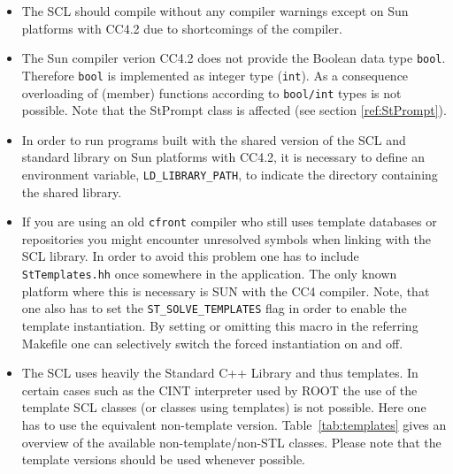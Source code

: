 \documentclass[twoside]{article}
\newcommand{\name}[1]{\textsf{#1}}%
\newcommand{\comp}[1]{\texttt{#1}}%
\begin{document}
\begin{itemize}
\item The SCL should compile without any compiler warnings except on
    \name{Sun}  platforms with CC4.2 due to shortcomings of
    the compiler.
\item The \name{Sun} compiler verion CC4.2 does not provide the
    Boolean data type \comp{bool}.  Therefore \comp{bool}
    is implemented as integer type (\comp{int}).  As a consequence
    overloading of (member) functions according to \comp{bool/int}
    types is not possible. Note that the StPrompt 
    class is affected (see section \ref{ref:StPrompt}).
\item In order to run programs built with the shared version of the
    SCL and standard library on Sun platforms with CC4.2, it is
    necessary to define an environment variable,
    \comp{LD\_LIBRARY\_PATH}, to indicate the
    directory containing the shared library.
\item If you are using an old \texttt{cfront} compiler  who still uses template databases or repositories
    you might encounter unresolved symbols when linking with the SCL
    library.  In order to avoid this problem one has to include
    \comp{StTemplates.hh} once somewhere in the
    application. The only known platform where this is necessary is
    SUN with the CC4 compiler. Note, that one also has to set the
    \comp{ST\_SOLVE\_TEMPLATES} flag in order to enable the template
    instantiation.  By setting or omitting this macro in the referring
    Makefile one can selectively switch the forced instantiation on
    and off.
\item The SCL uses heavily the Standard C++ Library and thus
    templates. In certain cases such as the CINT 
    interpreter used by ROOT  the use of the template SCL
    classes (or classes using templates) is not possible.  Here one
    has to use the equivalent non-template version.
    Table~\ref{tab:templates} gives an overview of the available
    non-template/non-STL classes. Please note that the template
    versions should be used whenever possible.
\end{itemize}
\end{document}
